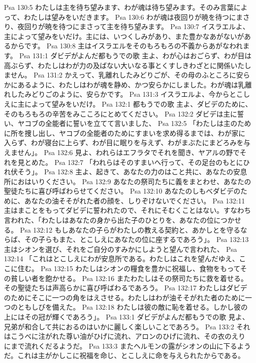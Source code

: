 Psa 130:5  わたしは主を待ち望みます、わが魂は待ち望みます。そのみ言葉によって、わたしは望みをいだきます。
Psa 130:6  わが魂は夜回りが暁を待つにまさり、夜回りが暁を待つにまさって主を待ち望みます。
Psa 130:7  イスラエルよ、主によって望みをいだけ。主には、いつくしみがあり、また豊かなあがないがあるからです。
Psa 130:8  主はイスラエルをそのもろもろの不義からあがなわれます。
Psa 131:1  ダビデがよんだ都もうでの歌 主よ、わが心はおごらず、わが目は高ぶらず、わたしはわが力の及ばない大いなる事とくすしきわざとに関係いたしません。
Psa 131:2  かえって、乳離れしたみどりごが、その母のふところに安らかにあるように、わたしはわが魂を静め、かつ安らかにしました。わが魂は乳離れしたみどりごのように、安らかです。
Psa 131:3  イスラエルよ、今からとこしえに主によって望みをいだけ。
Psa 132:1  都もうでの歌 主よ、ダビデのために、そのもろもろの辛苦をみこころにとめてください。
Psa 132:2  ダビデは主に誓い、ヤコブの全能者に誓いを立てて言いました、
Psa 132:5  「わたしは主のために所を捜し出し、ヤコブの全能者のためにすまいを求め得るまでは、わが家に入らず、わが寝台に上らず、わが目に眠りを与えず、わがまぶたにまどろみを与えません」。
Psa 132:6  見よ、われらはエフラタでそれを聞き、ヤアルの野でそれを見とめた。
Psa 132:7  「われらはそのすまいへ行って、その足台のもとにひれ伏そう」。
Psa 132:8  主よ、起きて、あなたの力のはこと共に、あなたの安息所におはいりください。
Psa 132:9  あなたの祭司たちに義をまとわせ、あなたの聖徒たちに喜び呼ばわらせてください。
Psa 132:10  あなたのしもべダビデのために、あなたの油そそがれた者の顔を、しりぞけないでください。
Psa 132:11  主はまことをもってダビデに誓われたので、それにそむくことはない。すなわち言われた、「わたしはあなたの身から出た子のひとりを、あなたの位につかせる。
Psa 132:12  もしあなたの子らがわたしの教える契約と、あかしとを守るならば、その子らもまた、とこしえにあなたの位に座するであろう」。
Psa 132:13  主はシオンを選び、それをご自分のすみかにしようと望んで言われた、
Psa 132:14  「これはとこしえにわが安息所である。わたしはこれを望んだゆえ、ここに住む。
Psa 132:15  わたしはシオンの糧食を豊かに祝福し、食物をもってその貧しい者を飽かせる。
Psa 132:16  またわたしはその祭司たちに救を着せる。その聖徒たちは声高らかに喜び呼ばわるであろう。
Psa 132:17  わたしはダビデのためにそこに一つの角をはえさせる。わたしはわが油そそがれた者のために一つのともしびを備えた。
Psa 132:18  わたしは彼の敵に恥を着せる。しかし彼の上にはその冠が輝くであろう」。
Psa 133:1  ダビデがよんだ都もうでの歌 見よ、兄弟が和合して共におるのはいかに麗しく楽しいことであろう。
Psa 133:2  それはこうべに注がれた尊い油がひげに流れ、アロンのひげに流れ、その衣のえりにまで流れくだるようだ。
Psa 133:3  またヘルモンの露がシオンの山に下るようだ。これは主がかしこに祝福を命じ、とこしえに命を与えられたからである。
